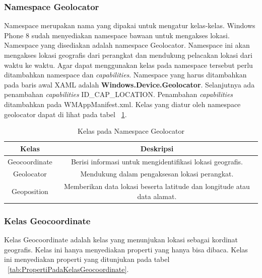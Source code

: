 \subsubsection{Namespace Geolocator}
\label{subsubsec:Namespace Geolocator}
\hspace{0.5cm} Namespace merupakan nama yang dipakai untuk mengatur kelas-kelas. Windows Phone 8 sudah menyediakan namespace bawaan untuk mengakses lokasi. Namespace yang disediakan adalah namespace Geolocator. Namespace ini akan mengakses lokasi geografis dari perangkat dan mendukung pelacakan lokasi dari waktu ke waktu. Agar dapat menggunakan kelas pada namespace tersebut perlu ditambahkan namespace dan \textit{capabilities}. Namespace yang harus ditambahkan pada baris awal XAML adalah \textbf{Windows.Device.Geolocator}. Selanjutnya ada penambahan \textit{capabilities} ID\_CAP\_LOCATION. Penambahan \textit{capabilities} ditambahkan pada WMAppManifest.xml. Kelas yang diatur oleh namespace geolocator dapat di lihat pada tabel ~\ref{tab:KelasPadaNamespaceGeolocator}.
\begin{table}[h]
	\centering
		\begin{tabular}{ |c|c|}
				\hline
				Kelas & Deskripsi \\ \hline
				Geocoordinate & Berisi informasi untuk mengidentifikasi lokasi geografis. \\ \hline
				Geolocator & Mendukung dalam pengaksesan lokasi perangkat. \\ \hline
				Geoposition & Memberikan data lokasi beserta latitude dan longitude atau data alamat. \\ \hline
				\hline
		\end{tabular}
	\caption{Kelas pada Namespace Geolocator}
	\label{tab:KelasPadaNamespaceGeolocator}
\end{table}

\subsubsection{Kelas Geocoordinate}
\label{subsubsec:Kelas Geocoordinate}
\hspace{0.5cm} Kelas Geocoordinate adalah kelas yang menunjukan lokasi sebagai kordinat geografis. Kelas ini hanya menyediakan properti yang hanya bisa dibaca. Kelas ini menyediakan properti yang ditunjukan pada tabel ~\ref{tab:PropertiPadaKelasGeocoordinate}.

